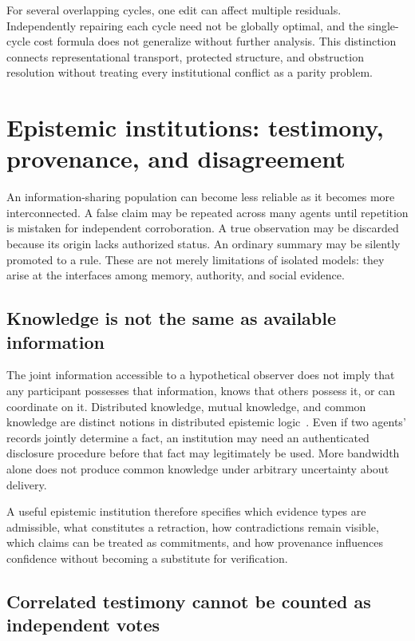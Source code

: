 \documentclass[11pt,letterpaper]{article}
\theoremstyle{plain}
\theoremstyle{definition}
\theoremstyle{remark}
\begin{document}
For several overlapping cycles, one edit can affect multiple residuals. Independently repairing each cycle need not be globally optimal, and the single-cycle cost formula does not generalize without further analysis. This distinction connects representational transport, protected structure, and obstruction resolution without treating every institutional conflict as a parity problem.

\section{Epistemic institutions: testimony, provenance, and disagreement}\label{sec:epistemic}

An information-sharing population can become less reliable as it becomes more interconnected. A false claim may be repeated across many agents until repetition is mistaken for independent corroboration. A true observation may be discarded because its origin lacks authorized status. An ordinary summary may be silently promoted to a rule. These are not merely limitations of isolated models: they arise at the interfaces among memory, authority, and social evidence.

\subsection{Knowledge is not the same as available information}

The joint information accessible to a hypothetical observer does not imply that any participant possesses that information, knows that others possess it, or can coordinate on it. Distributed knowledge, mutual knowledge, and common knowledge are distinct notions in distributed epistemic logic~\cite{halpernmoses}. Even if two agents' records jointly determine a fact, an institution may need an authenticated disclosure procedure before that fact may legitimately be used. More bandwidth alone does not produce common knowledge under arbitrary uncertainty about delivery.

A useful epistemic institution therefore specifies which evidence types are admissible, what constitutes a retraction, how contradictions remain visible, which claims can be treated as commitments, and how provenance influences confidence without becoming a substitute for verification.

\subsection{Correlated testimony cannot be counted as independent votes}
\end{document}
